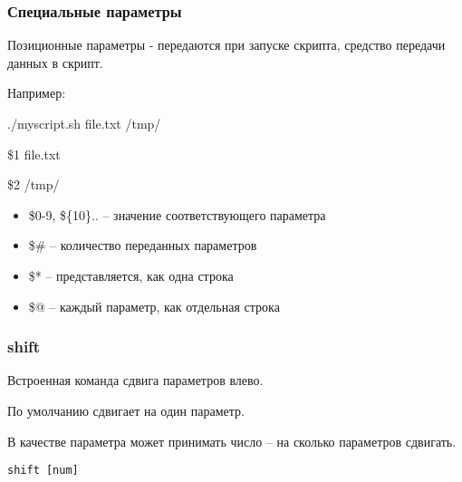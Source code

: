 \begin{frame}
	\frametitle{Специальные параметры}

	Позиционные параметры - передаются при запуске скрипта, средство передачи данных в скрипт.

        Например: 

        ./myscript.sh file.txt /tmp/

        \$1 file.txt

        \$2 /tmp/
        
	\begin{itemize}
		\item \$0-9, \$\{10\}.. -- значение соответствующего параметра
		\item \$\# -- количество переданных параметров
		\item \$* -- представляется, как одна строка
		\item \$@ -- каждый параметр, как отдельная строка
	\end{itemize}

\end{frame}


\begin{frame}[fragile]
	\frametitle{shift}

	Встроенная команда сдвига параметров влево.

        По умолчанию сдвигает на один параметр.

	В качестве параметра может принимать число -- на сколько параметров сдвигать.

\begin{lstlisting}
shift [num]
\end{lstlisting}

\end{frame}


%
%

